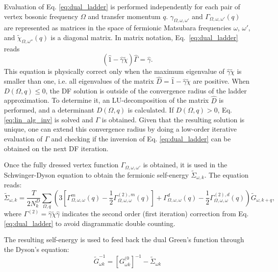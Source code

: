 \documentclass[3p,times,procedia]{elsarticle}
\begin{document}
Evaluation of Eq. \ref{eq:dual_ladder} is performed independently for each pair of vertex bosonic frequency $\Omega$ and transfer momentum $q$. 
$\gamma_{\Omega,\omega,\omega'}$ and $\Gamma_{\Omega,\omega,\omega'}(q)$ are represented as matrices in the space of fermionic Matsubara frequencies $\omega$, $\omega'$, and $\tilde\chi_{\Omega,\omega''}(q)$ is a diagonal matrix. 
In matrix notation, Eq.~\ref{eq:dual_ladder} reads
\begin{equation}\label{eq:lin_alg_inv}
(\hat 1 - \hat \gamma \tilde \chi)\hat \Gamma  = \hat \gamma.
\end{equation} 
This equation is physically correct only when the maximum eigenvalue of $\hat \gamma \tilde \chi$ is smaller than one, i.e. all eigenvalues of the matrix $\hat D = \hat 1 - \hat \gamma \tilde \chi$ are positive. When $D(\Omega, q) \leq 0$, the DF solution is outside of the convergence radius of the ladder approximation.
To determine it, an LU-decomposition of the matrix $\hat D$ is performed, and a determinant $D(\Omega, q)$ is calculated.
If $D(\Omega, q) > 0$,  Eq. \ref{eq:lin_alg_inv} is solved and $\Gamma$ is obtained.
Given that the resulting solution is unique, one can extend this convergence radius by doing a low-order iterative evaluation of $\Gamma$ and checking if the inversion of Eq. \ref{eq:dual_ladder} can be obtained on the next DF iteration. 
 
Once the fully dressed vertex function $\Gamma_{\Omega,\omega,\omega'}$ is obtained, it is used in the Schwinger-Dyson equation to obtain the fermionic self-energy $\tilde \Sigma_{\omega, k}$. 
The equation reads:
\begin{equation}\label{eq:sd}
\tilde \Sigma_{\omega, k} = \frac{T}{2 N_k^D}  \sum_{\Omega, q} \left( 3 \left[\Gamma^m_{\Omega,\omega,\omega}(q) - \frac{1}{2}\Gamma^{(2), m}_{\Omega,\omega,\omega}(q) \right] + \Gamma^d_{\Omega,\omega,\omega}(q) - \frac{1}{2}\Gamma^{(2), d}_{\Omega,\omega,\omega}(q)  \right) \tilde G_{\omega, k + q},
\end{equation}
where $\Gamma^{(2)} = \hat \gamma \tilde \chi \hat \gamma $ indicates the second order (first iteration) correction from Eq. \ref{eq:dual_ladder} to avoid diagrammatic double counting. 

The resulting self-energy is used to feed back the dual Green's function through the Dyson's equation:
\begin{equation}\label{eq:dyson}
\tilde G^{-1}_{\omega k} = \left[G^{(0}_{\omega k}\right]^{-1} - \tilde \Sigma_{\omega k}
\end{equation}
\end{document}
